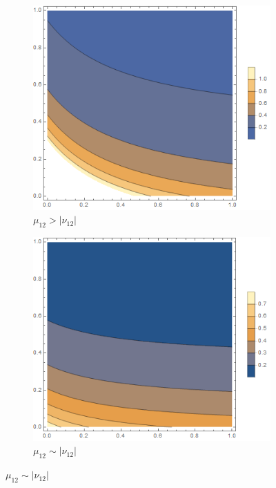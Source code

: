 \documentclass[12pt,a4]{article}
\begin{document}
\begin{figure}[!ht]
	\begin{subfigure}[b]{0.3\textwidth}
		\centering
		\includegraphics[width=\textwidth]{Joonised/Gamma22Mu11Mu22I}
		\caption{$ \mu_{12} > |\nu_{12}| $}
	\end{subfigure}
	\hfill
	\begin{subfigure}[b]{0.3\textwidth}
		\centering
		\includegraphics[width=\textwidth]{Joonised/Gamma22Mu11Mu22II}
		\caption{$ \mu_{12} \sim | \nu_{12}| $}

\end{subfigure}
\end{figure}
\end{document}

